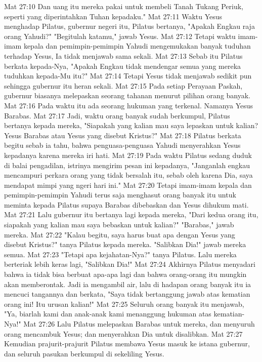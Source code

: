 Mat 27:10  Dan uang itu mereka pakai untuk membeli Tanah Tukang Periuk, seperti yang diperintahkan Tuhan kepadaku."
Mat 27:11  Waktu Yesus menghadap Pilatus, gubernur negeri itu, Pilatus bertanya, "Apakah Engkau raja orang Yahudi?" "Begitulah katamu," jawab Yesus.
Mat 27:12  Tetapi waktu imam-imam kepala dan pemimpin-pemimpin Yahudi mengemukakan banyak tuduhan terhadap Yesus, Ia tidak menjawab sama sekali.
Mat 27:13  Sebab itu Pilatus berkata kepada-Nya, "Apakah Engkau tidak mendengar semua yang mereka tuduhkan kepada-Mu itu?"
Mat 27:14  Tetapi Yesus tidak menjawab sedikit pun sehingga gubernur itu heran sekali.
Mat 27:15  Pada setiap Perayaan Paskah, gubernur biasanya melepaskan seorang tahanan menurut pilihan orang banyak.
Mat 27:16  Pada waktu itu ada seorang hukuman yang terkenal. Namanya Yesus Barabas.
Mat 27:17  Jadi, waktu orang banyak sudah berkumpul, Pilatus bertanya kepada mereka, "Siapakah yang kalian mau saya lepaskan untuk kalian? Yesus Barabas atau Yesus yang disebut Kristus?"
Mat 27:18  Pilatus berkata begitu sebab ia tahu, bahwa penguasa-penguasa Yahudi menyerahkan Yesus kepadanya karena mereka iri hati.
Mat 27:19  Pada waktu Pilatus sedang duduk di balai pengadilan, istrinya mengirim pesan ini kepadanya, "Janganlah engkau mencampuri perkara orang yang tidak bersalah itu, sebab oleh karena Dia, saya mendapat mimpi yang ngeri hari ini."
Mat 27:20  Tetapi imam-imam kepala dan pemimpin-pemimpin Yahudi terus saja menghasut orang banyak itu untuk meminta kepada Pilatus supaya Barabas dibebaskan dan Yesus dihukum mati.
Mat 27:21  Lalu gubernur itu bertanya lagi kepada mereka, "Dari kedua orang itu, siapakah yang kalian mau saya bebaskan untuk kalian?" "Barabas," jawab mereka.
Mat 27:22  "Kalau begitu, saya harus buat apa dengan Yesus yang disebut Kristus?" tanya Pilatus kepada mereka. "Salibkan Dia!" jawab mereka semua.
Mat 27:23  "Tetapi apa kejahatan-Nya?" tanya Pilatus. Lalu mereka berteriak lebih keras lagi, "Salibkan Dia!"
Mat 27:24  Akhirnya Pilatus menyadari bahwa ia tidak bisa berbuat apa-apa lagi dan bahwa orang-orang itu mungkin akan memberontak. Jadi ia mengambil air, lalu di hadapan orang banyak itu ia mencuci tangannya dan berkata, "Saya tidak bertanggung jawab atas kematian orang ini! Itu urusan kalian!"
Mat 27:25  Seluruh orang banyak itu menjawab, "Ya, biarlah kami dan anak-anak kami menanggung hukuman atas kematian-Nya!"
Mat 27:26  Lalu Pilatus melepaskan Barabas untuk mereka, dan menyuruh orang mencambuk Yesus; dan menyerahkan Dia untuk disalibkan.
Mat 27:27  Kemudian prajurit-prajurit Pilatus membawa Yesus masuk ke istana gubernur, dan seluruh pasukan berkumpul di sekeliling Yesus.
